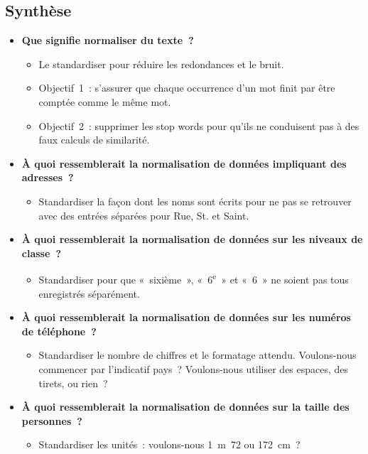\documentclass[12pt,a4paper]{article}
\begin{document}
\subsection{Synthèse}

\begin{thinkbox}
  \begin{itemize}
    \item \textbf{Que signifie normaliser du texte~?}
    \begin{itemize}
      \item Le standardiser pour réduire les redondances et le bruit.
      \item Objectif~1~: s'assurer que chaque occurrence d'un mot finit par être comptée comme le même mot.
      \item Objectif~2~: supprimer les stop words pour qu'ils ne conduisent pas à des faux calculs de similarité.
    \end{itemize}
    \item \textbf{À quoi ressemblerait la normalisation de données impliquant des adresses~?}
    \begin{itemize}
      \item Standardiser la façon dont les noms sont écrits pour ne pas se retrouver avec des entrées séparées pour Rue, St. et Saint.
    \end{itemize}
    \item \textbf{À quoi ressemblerait la normalisation de données sur les niveaux de classe~?}
    \begin{itemize}
      \item Standardiser pour que «~sixième~», «~6\textsuperscript{e}~» et «~6~» ne soient pas tous enregistrés séparément.
    \end{itemize}
    \item \textbf{À quoi ressemblerait la normalisation de données sur les numéros de téléphone~?}
    \begin{itemize}
      \item Standardiser le nombre de chiffres et le formatage attendu. Voulons-nous commencer par l'indicatif pays~? Voulons-nous utiliser des espaces, des tirets, ou rien~?
    \end{itemize}
    \item \textbf{À quoi ressemblerait la normalisation de données sur la taille des personnes~?}
    \begin{itemize}
      \item Standardiser les unités~: voulons-nous 1~m~72 ou 172~cm~?
    \end{itemize}
  \end{itemize}
\end{thinkbox}
\end{document}
